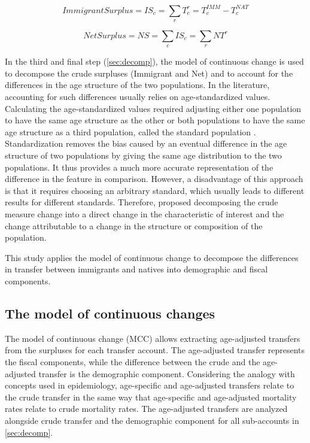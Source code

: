 \begin{equation}\label{eq:is}
  Immigrant Surplus=IS_{c}= \displaystyle\sum_{r}T^{r}_{c}=T^{IMM}_{c}-T^{NAT}_{c}
\end{equation}

\begin{equation}\label{eq:ns}
  Net Surplus = NS = \displaystyle\sum_{c}IS_{c} = \displaystyle\sum_{r}NT^{r}
\end{equation}

\vspace{0.7em}\par
In the third and final step (\autoref{sec:decomp}), the model of continuous change \citep{horiuchiDecompositionMethodBased2008} is used to decompose the crude surpluses (Immigrant and Net) and to account for the differences in the age structure of the two populations.
In the literature, accounting for such differences usually relies on age-standardized values.
Calculating the age-standardized values required adjusting either one population to have the same age structure as the other or both populations to have the same age structure as a third population, called the standard population \citep{statCan:001}.
Standardization removes the bias caused by an eventual difference in the age structure of two populations by giving the same age distribution to the two populations. It thus provides a much more accurate representation of the difference in the feature in comparison.
However, a disadvantage of this approach is that it requires choosing an arbitrary standard, which usually leads to different results for different standards.
Therefore, \citet{prskawetzDecomposingChangeLabour2005} proposed decomposing the crude measure change into a direct change in the characteristic of interest and the change attributable to a change in the structure or composition of the population.

\vspace{0.7em}\par
This study applies the model of continuous change \citep{horiuchiDecompositionMethodBased2008} to decompose the differences in transfer between immigrants and natives into demographic and fiscal components.

\subsection{The model of continuous changes}\label{sec:modelMCC}

The model of continuous change (MCC) allows extracting age-adjusted transfers from the surpluses for each transfer account.
The age-adjusted transfer represents the fiscal components, while the difference between the crude and the age-adjusted transfer is the demographic component.
Considering the analogy with concepts used in epidemiology, age-specific and age-adjusted transfers relate to the crude transfer in the same way that age-specific and age-adjusted mortality rates relate to crude mortality rates.
The age-adjusted transfers are analyzed alongside crude transfer and the demographic component for all sub-accounts in \autoref{sec:decomp}.


